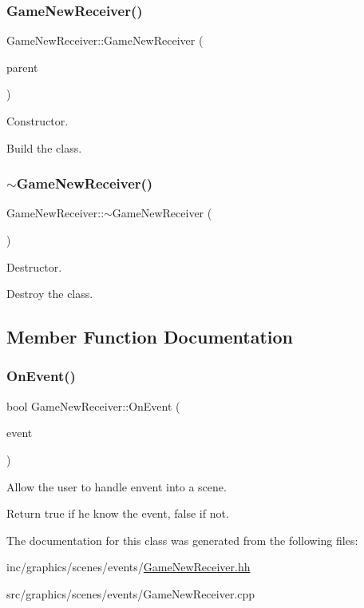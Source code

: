 \subsubsection{\texorpdfstring{Game\+New\+Receiver()}{GameNewReceiver()}}
{\footnotesize\ttfamily Game\+New\+Receiver\+::\+Game\+New\+Receiver (\begin{DoxyParamCaption}\item[{\hyperlink{classGameNewScene}{Game\+New\+Scene} $\ast$}]{parent }\end{DoxyParamCaption})}



Constructor. 

Build the class. \mbox{\label{classGameNewReceiver_ab92b6653b56d291853a4e2f737eaf6fd}} 
\subsubsection{\texorpdfstring{$\sim$\+Game\+New\+Receiver()}{~GameNewReceiver()}}
{\footnotesize\ttfamily Game\+New\+Receiver\+::$\sim$\+Game\+New\+Receiver (\begin{DoxyParamCaption}{ }\end{DoxyParamCaption})}



Destructor. 

Destroy the class. 

\subsection{Member Function Documentation}
\mbox{\label{classGameNewReceiver_ad9ec097d8b46946ed1a21c24463fc0b6}} 
\subsubsection{\texorpdfstring{On\+Event()}{OnEvent()}}
{\footnotesize\ttfamily bool Game\+New\+Receiver\+::\+On\+Event (\begin{DoxyParamCaption}\item[{const irr\+::\+S\+Event \&}]{event }\end{DoxyParamCaption})}



Allow the user to handle envent into a scene. 

Return true if he know the event, false if not. 

The documentation for this class was generated from the following files\+:\begin{DoxyCompactItemize}
\item 
inc/graphics/scenes/events/\hyperlink{GameNewReceiver_8hh}{Game\+New\+Receiver.\+hh}\item 
src/graphics/scenes/events/Game\+New\+Receiver.\+cpp\end{DoxyCompactItemize}
